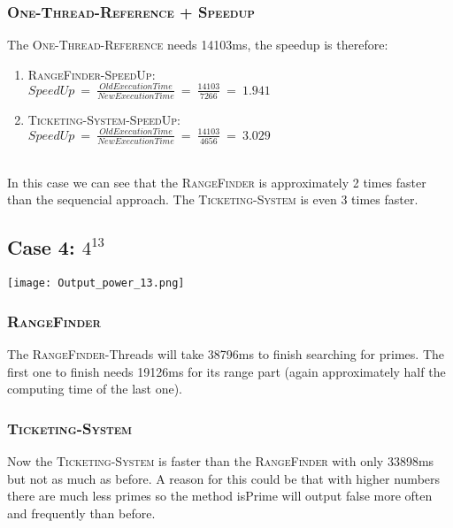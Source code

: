 \documentclass{article}
\begin{document}
\begin{adjustwidth}{2em}{2em}
\begin{adjustwidth}{2em}{2em}
			\subsubsection*{\textsc{One-Thread-Reference + Speedup}}
			\begin{adjustwidth}{1em}{}
				The \textsc{One-Thread-Reference} needs 14103ms, the speedup is therefore: \\
				\begin{enumerate}[]
					\item \textsc{RangeFinder-SpeedUp}: \\
					$\textit{SpeedUp} \ = \ \frac{\textit{OldExecutionTime}}{\textit{NewExecutionTime}} \ = \ \frac{14103}{7266} \ = \ 1.941$
					\item \textsc{Ticketing-System-SpeedUp}: \\
					$\textit{SpeedUp} \ = \ \frac{\textit{OldExecutionTime}}{\textit{NewExecutionTime}} \ = \ \frac{14103}{4656} \ = \ 3.029$
				\end{enumerate}
				\hfill \\
				In this case we can see that the \textsc{RangeFinder} is approximately 2 times faster than the sequencial approach. The \textsc{Ticketing-System} is even 3 times faster.
			\end{adjustwidth}
		\end{adjustwidth}

		\newpage		
		
		\subsection*{Case 4: $4^{13}$}
		\begin{adjustwidth}{2em}{2em}
			\texttt{[image: Output\_power\_13.png]}
			\subsubsection*{\textsc{RangeFinder}}
			\begin{adjustwidth}{1em}{}
				The \textsc{RangeFinder}-Threads will take 38796ms to finish searching for primes. The first one to finish needs 19126ms for its range part (again approximately half the computing time of the last one).
			\end{adjustwidth}
			\subsubsection*{\textsc{Ticketing-System}}
			\begin{adjustwidth}{1em}{}
				Now the \textsc{Ticketing-System} is faster than the \textsc{RangeFinder} with only 33898ms but not as much as before. A reason for this could be that with higher numbers there are much less primes so the method isPrime will output false more often and frequently than before.
			\end{adjustwidth}

\end{adjustwidth}
\end{adjustwidth}
\end{document}
